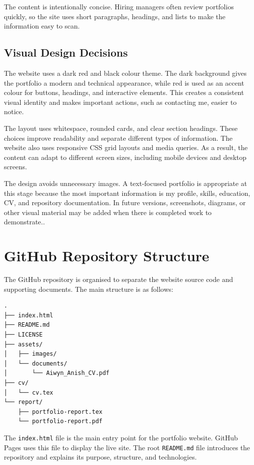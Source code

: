 \documentclass[12pt, a4paper]{article}
\begin{document}
The content is intentionally concise. Hiring managers often review portfolios
quickly, so the site uses short paragraphs, headings, and lists to make the
information easy to scan.

\subsection{Visual Design Decisions}

The website uses a dark red and black colour theme. The dark background gives
the portfolio a modern and technical appearance, while red is used as an
accent colour for buttons, headings, and interactive elements. This creates a
consistent visual identity and makes important actions, such as contacting me,
easier to notice.

The layout uses whitespace, rounded cards, and clear section headings. These
choices improve readability and separate different types of information. The
website also uses responsive CSS grid layouts and media queries. As a result,
the content can adapt to different screen sizes, including mobile devices and
desktop screens.

The design avoids unnecessary images. A text-focused portfolio is appropriate
at this stage because the most important information is my profile, skills,
education, CV, and repository documentation. In future versions, screenshots,
diagrams, or other visual material may be added when there is completed work
to demonstrate..

\section{GitHub Repository Structure}

The GitHub repository is organised to separate the website source code and
supporting documents. The main structure is as follows:

\begin{verbatim}
.
├── index.html
├── README.md
├── LICENSE
├── assets/
│   ├── images/
│   └── documents/
│       └── Aiwyn_Anish_CV.pdf
├── cv/
│   └── cv.tex
└── report/
    ├── portfolio-report.tex
    └── portfolio-report.pdf
\end{verbatim}

The \texttt{index.html} file is the main entry point for the portfolio
website. GitHub Pages uses this file to display the live site. The root
\texttt{README.md} file introduces the repository and explains its purpose,
structure, and technologies.
\end{document}
